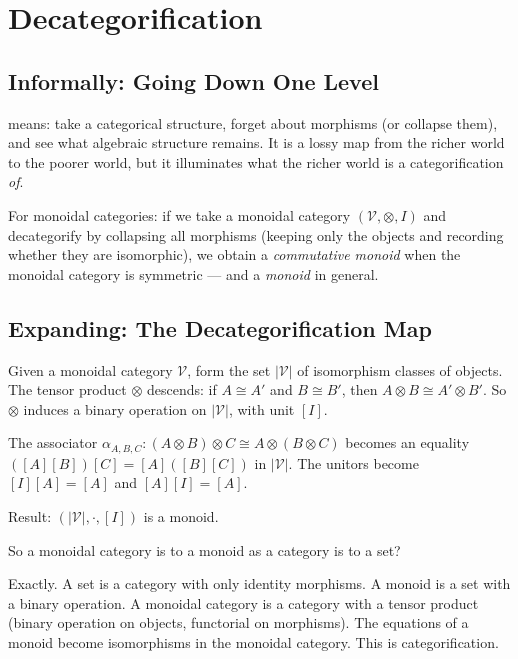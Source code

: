 \section{Decategorification}
\label{sec:decategorification}

\subsection{Informally: Going Down One Level}

 means: take a categorical structure, forget about
morphisms (or collapse them), and see what algebraic structure remains. It is a
lossy map from the richer world to the poorer world, but it illuminates what
the richer world is a categorification \emph{of}.

For monoidal categories: if we take a monoidal category $(\mathcal{V}, \otimes,
I)$ and decategorify by collapsing all morphisms (keeping only the objects and
recording whether they are isomorphic), we obtain a \emph{commutative monoid}
when the monoidal category is symmetric --- and a \emph{monoid} in general.

\subsection{Expanding: The Decategorification Map}

Given a monoidal category $\mathcal{V}$, form the set $|\mathcal{V}|$ of
isomorphism classes of objects. The tensor product $\otimes$ descends: if
$A \cong A'$ and $B \cong B'$, then $A \otimes B \cong A' \otimes B'$. So
$\otimes$ induces a binary operation on $|\mathcal{V}|$, with unit $[I]$.

The associator $\alpha_{A,B,C} : (A \otimes B) \otimes C \cong A \otimes (B \otimes C)$
becomes an equality $([A][B])[C] = [A]([B][C])$ in $|\mathcal{V}|$. The unitors
become $[I][A] = [A]$ and $[A][I] = [A]$.

Result: $(|\mathcal{V}|, \cdot, [I])$ is a monoid.

\begin{dialog}
So a monoidal category is to a monoid as a category is to a set?

Exactly. A set is a category with only identity morphisms. A monoid is a set with
a binary operation. A monoidal category is a category with a tensor product
(binary operation on objects, functorial on morphisms). The equations of a monoid
become isomorphisms in the monoidal category. This is categorification.
\end{dialog}

